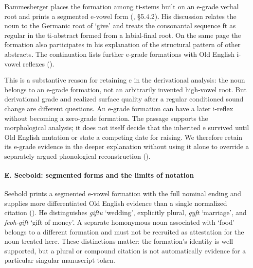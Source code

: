 \documentclass[
  british,
  a4paper,
]{article}
\begin{document}
Bammesberger places the formation among ti-stems built on an e-grade
verbal root and prints a segmented e-vowel form
(, §5.4.2). His
discussion relates the noun to the Germanic root of `give' and treats
the consonantal sequence ft as regular in the ti-abstract formed from a
labial-final root. On the same page the formation also participates in
his explanation of the structural pattern of other abstracts. The
continuation lists further e-grade formations with Old English i-vowel
reflexes ().

This is a substantive reason for retaining e in the derivational
analysis: the noun belongs to an e-grade formation, not an arbitrarily
invented high-vowel root. But derivational grade and realized surface
quality after a regular conditioned sound change are different
questions. An e-grade formation can have a later i-reflex without
becoming a zero-grade formation. The passage supports the morphological
analysis; it does not itself decide that the inherited e survived until
Old English mutation or state a competing date for raising. We therefore
retain its e-grade evidence in the deeper explanation without using it
alone to override a separately argued phonological reconstruction
().

\paragraph{E. Seebold: segmented forms and the limits of
notation}\label{e.-seebold-segmented-forms-and-the-limits-of-notation}

Seebold prints a segmented e-vowel formation with the full nominal
ending and supplies more differentiated Old English evidence than a
single normalized citation (). He distinguishes \emph{giftu} `wedding', explicitly plural,
\emph{gyft} `marriage', and \emph{feoh-gift} `gift of money'. A separate
homonymous noun associated with `food' belongs to a different formation
and must not be recruited as attestation for the noun treated here.
These distinctions matter: the formation's identity is well supported,
but a plural or compound citation is not automatically evidence for a
particular singular manuscript token.
\end{document}
